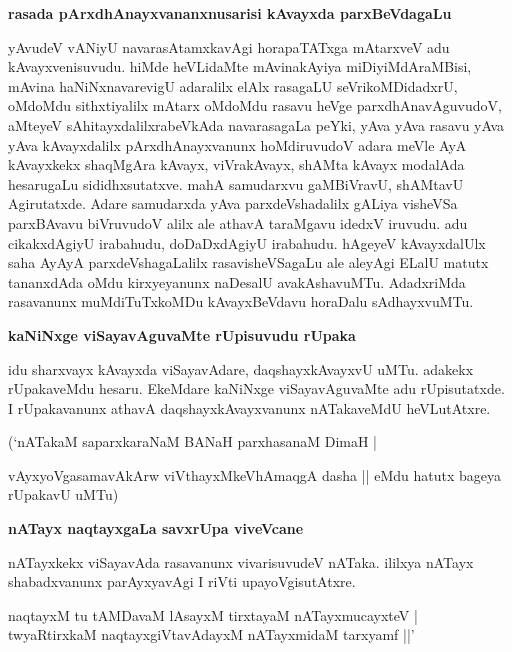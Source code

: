 {\medskip
\noindent
{\large\bf rasada pArxdhAnayxvananxnusarisi kAvayxda parxBeVdagaLu}}\label{page240}
\smallskip

\noindent
yAvudeV vANiyU navarasAtamxkavAgi horapaTATxga mAtarxveV adu kAvayx\-venisuvudu. hiMde heVLi\-daMte mAvinakAyiya miDiyiMdAraMBisi, mAvina haNiNxnavarevigU adaralilx elAlx rasagaLU seVrikoMDidadxrU, oMdoMdu sithxtiyalilx mAtarx oMdoMdu rasavu heVge parxdhAnavAguvudoV, aMte\-yeV sAhitayxdalilxrabeVkAda navarasagaLa peYki, yAva yAva rasavu yAva yAva kAvayxdalilx pArxdhAnayx\-vanunx hoMdiruvudoV adara meVle AyA kAvayxkekx shaqMgAra kAvayx, viVrakAvayx, shAMta kAvayx moda\-lAda hesarugaLu sididhxsutatxve. mahA samudarxvu gaMBiVravU, shAMtavU Agirutatxde. Adare samudarxda yAva parxdeVshadalilx gALiya visheVSa parxBAvavu biVruvudoV alilx ale athavA taraMgavu idedxV iru\-vudu. adu cikakxdAgiyU irabahudu, doDaDxdAgiyU irabahudu. hAgeyeV kAvayxdalUlx saha AyAyA parxdeVshagaLalilx rasavisheVSagaLu ale aleyAgi ELalU matutx tananxdAda oMdu kirxye\-yanunx naDesalU avakAshavuMTu. AdadxriMda rasavanunx muMdiTuTxkoMDu kAvayxBeVdavu horaDalu sAdhayx\-vuMTu.

{\medskip
\noindent
{\large\bf kaNiNxge viSayavAguvaMte rUpisuvudu rUpaka}}\label{page241}
\smallskip

\noindent
idu sharxvayx kAvayxda viSayavAdare, daqshayxkAvayxvU uMTu. adakekx rUpakaveMdu hesaru. EkeMdare kaNiNxge viSayavAguvaMte adu rUpisutatxde. I rUpakavanunx athavA daqshayxkAvayxvanunx nATakaveMdU heVLutAtxre. 


(`nATakaM saparxkaraNaM\label{241} BANaH parxhasanaM DimaH |

vAyxyoVgasamavAkArw viVthayxMkeVhAmaqgA dasha || eMdu hatutx bageya rUpakavU uMTu)

{\medskip
\noindent
{\large\bf nATayx naqtayxgaLa savxrUpa viveVcane}}\label{page241}
\smallskip

\noindent
nATayxkekx viSayavAda rasavanunx vivarisuvudeV nATaka. ililxya nATayx shabadxvanunx parAyxyavAgi I riVti upayoVgisutAtxre.

\begin{shloka}
naqtayxM tu tAMDavaM lAsayxM tirxtayaM nATayxmucayxteV |\\\label{241}
twyaRtirxkaM naqtayxgiVtavAdayxM nATayxmidaM tarxyamf ||\label{241}'
\end{shloka}

